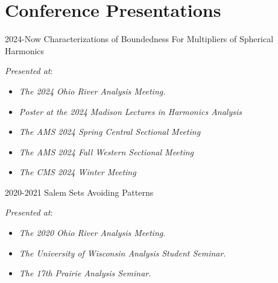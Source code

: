 \documentclass[a4paper]{cv-friggeri}
\begin{document}


\vspace{-2em} \section{Conference Presentations}

\begin{entrylist}

\entry
{2024-Now}
{Characterizations of Boundedness For Multipliers of Spherical Harmonics}
{}
{\emph{Presented at}:
%
\begin{itemize}
	\item \emph{The 2024 Ohio River Analysis Meeting.}
	\item \emph{Poster at the 2024 Madison Lectures in Harmonics Analysis}
	\item \emph{The AMS 2024 Spring Central Sectional Meeting}%
	\item \emph{The AMS 2024 Fall Western Sectional Meeting}%
	\item \emph{The CMS 2024 Winter Meeting}
\end{itemize}
%
}

\entry
{2020-2021}
{Salem Sets Avoiding Patterns}
{}
{\emph{Presented at}:
%
\begin{itemize}
	\item \emph{The 2020 Ohio River Analysis Meeting}.
	\item \emph{The University of Wisconsin Analysis Student Seminar}.
	\item \emph{The 17th Prairie Analysis Seminar}.
\end{itemize}
%
}


\end{entrylist}
\end{document}
